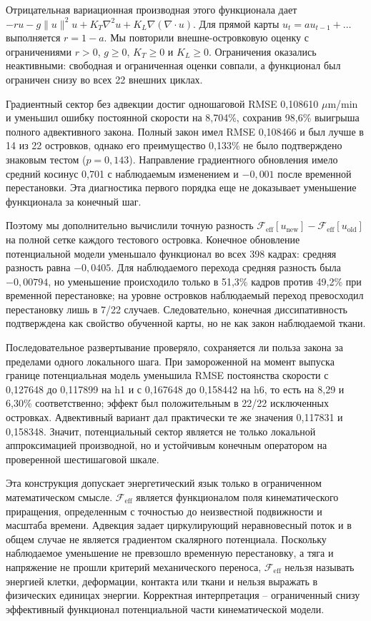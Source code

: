 \documentclass[11pt,a4paper]{article}
\begin{document}
Отрицательная вариационная производная этого функционала дает $-ru-g\|u\|^2u+K_T\nabla^2u+K_L\nabla(\nabla\!\cdot u)$. Для прямой карты $u_t=a u_{t-1}+\ldots$ выполняется $r=1-a$. Мы повторили внешне-островковую оценку с ограничениями $r>0$, $g\geq0$, $K_T\geq0$ и $K_L\geq0$. Ограничения оказались неактивными: свободная и ограниченная оценки совпали, а функционал был ограничен снизу во всех 22 внешних циклах.

Градиентный сектор без адвекции достиг одношаговой RMSE 0,108610 $\mu$m/min и уменьшил ошибку постоянной скорости на 8,704\%, сохранив 98,6\% выигрыша полного адвективного закона. Полный закон имел RMSE 0,108466 и был лучше в 14 из 22 островков, однако его преимущество 0,133\% не было подтверждено знаковым тестом ($p=0{,}143$). Направление градиентного обновления имело средний косинус 0,701 с наблюдаемым изменением и $-0,001$ после временной перестановки. Эта диагностика первого порядка еще не доказывает уменьшение функционала за конечный шаг.

Поэтому мы дополнительно вычислили точную разность $\mathcal F_{\mathrm{eff}}[u_{\mathrm{new}}]-\mathcal F_{\mathrm{eff}}[u_{\mathrm{old}}]$ на полной сетке каждого тестового островка. Конечное обновление потенциальной модели уменьшало функционал во всех 398 кадрах: средняя разность равна $-0{,}0405$. Для наблюдаемого перехода средняя разность была $-0{,}00794$, но уменьшение происходило только в 51,3\% кадров против 49,2\% при временной перестановке; на уровне островков наблюдаемый переход превосходил перестановку лишь в 7/22 случаев. Следовательно, конечная диссипативность подтверждена как свойство обученной карты, но не как закон наблюдаемой ткани.

Последовательное развертывание проверяло, сохраняется ли польза закона за пределами одного локального шага. При замороженной на момент выпуска границе потенциальная модель уменьшила RMSE постоянства скорости с 0,127648 до 0,117899 на h1 и с 0,167648 до 0,158442 на h6, то есть на 8,29 и 6,30\% соответственно; эффект был положительным в 22/22 исключенных островках. Адвективный вариант дал практически те же значения 0,117831 и 0,158348. Значит, потенциальный сектор является не только локальной аппроксимацией производной, но и устойчивым конечным оператором на проверенной шестишаговой шкале.

Эта конструкция допускает энергетический язык только в ограниченном математическом смысле. $\mathcal F_{\mathrm{eff}}$ является функционалом поля кинематического приращения, определенным с точностью до неизвестной подвижности и масштаба времени. Адвекция задает циркулирующий неравновесный поток и в общем случае не является градиентом скалярного потенциала. Поскольку наблюдаемое уменьшение не превзошло временную перестановку, а тяга и напряжение не прошли критерий механического переноса, $\mathcal F_{\mathrm{eff}}$ нельзя называть энергией клетки, деформации, контакта или ткани и нельзя выражать в физических единицах энергии. Корректная интерпретация -- ограниченный снизу эффективный функционал потенциальной части кинематической модели.
\end{document}
